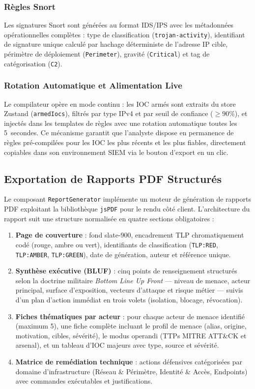 \subsubsection{Règles Snort}

Les signatures Snort sont générées au format IDS/IPS avec les métadonnées opérationnelles complètes : type de classification (\texttt{trojan-activity}), identifiant de signature unique calculé par hachage déterministe de l'adresse IP cible, périmètre de déploiement (\texttt{Perimeter}), gravité (\texttt{Critical}) et tag de catégorisation (\texttt{C2}).

\subsubsection{Rotation Automatique et Alimentation Live}

Le compilateur opère en mode continu : les IOC armés sont extraits du store Zustand (\texttt{armedIocs}), filtrés par type IPv4 et par seuil de confiance ($\geq 90\%$), et injectés dans les templates de règles avec une rotation automatique toutes les 5~secondes. Ce mécanisme garantit que l'analyste dispose en permanence de règles pré-compilées pour les IOC les plus récents et les plus fiables, directement copiables dans son environnement SIEM via le bouton d'export en un clic.

\subsection{Exportation de Rapports PDF Structurés}

Le composant \texttt{ReportGenerator} implémente un moteur de génération de rapports PDF exploitant la bibliothèque \texttt{jsPDF} pour le rendu côté client. L'architecture du rapport suit une structure normalisée en quatre sections obligatoires :

\begin{enumerate}
    \item \textbf{Page de couverture} : fond slate-900, encadrement TLP chromatiquement codé (rouge, ambre ou vert), identifiants de classification (\texttt{TLP:RED}, \texttt{TLP:AMBER}, \texttt{TLP:GREEN}), date de génération, auteur et référence unique.
    \item \textbf{Synthèse exécutive (BLUF)} : cinq points de renseignement structurés selon la doctrine militaire \textit{Bottom Line Up Front} --- niveau de menace, acteur principal, surface d'exposition, vecteurs d'attaque et risque métier --- suivis d'un plan d'action immédiat en trois volets (isolation, blocage, révocation).
    \item \textbf{Fiches thématiques par acteur} : pour chaque acteur de menace identifié (maximum 5), une fiche complète incluant le profil de menace (alias, origine, motivation, cibles, sévérité), le modus operandi (TTPs MITRE ATT\&CK et arsenal), et un tableau d'IOC majeurs avec type, source et sévérité.
    \item \textbf{Matrice de remédiation technique} : actions défensives catégorisées par domaine d'infrastructure (Réseau \& Périmètre, Identité \& Accès, Endpoints) avec commandes exécutables et justifications.
\end{enumerate}

